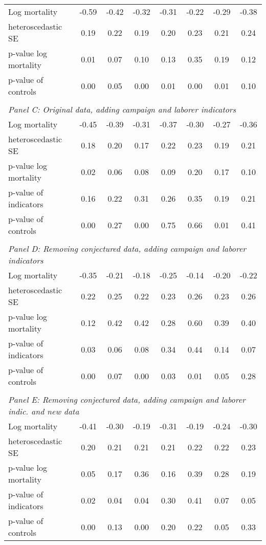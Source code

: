 \begin{table}[htb]
\begin{center}
\begin{tabular}{lccccccc}
Log mortality&-0.59&-0.42&-0.32&-0.31&-0.22&-0.29&-0.38\\
heteroscedastic SE&0.19&0.22&0.19&0.20&0.23&0.21&0.24\\
p-value log mortality&0.01&0.07&0.10&0.13&0.35&0.19&0.12\\
p-value of controls&0.00&0.05&0.00&0.01&0.00&0.01&0.10\\
\vspace{0.1cm}\\ 
\multicolumn{8}{l}{\textit{Panel C: Original data, adding campaign and laborer indicators}}\\ 
Log mortality&-0.45&-0.39&-0.31&-0.37&-0.30&-0.27&-0.36\\
heteroscedastic SE&0.18&0.20&0.17&0.22&0.23&0.19&0.21\\
p-value log mortality&0.02&0.06&0.08&0.09&0.20&0.17&0.10\\
p-value of indicators&0.16&0.22&0.31&0.26&0.35&0.19&0.21\\
p-value of controls&0.00&0.27&0.00&0.75&0.66&0.01&0.41\\
\vspace{0.1cm}\\ 
\multicolumn{8}{l}{\textit{Panel D: Removing conjectured data, adding campaign and laborer indicators}}\\ 
Log mortality&-0.35&-0.21&-0.18&-0.25&-0.14&-0.20&-0.22\\
heteroscedastic SE&0.22&0.25&0.22&0.23&0.26&0.23&0.26\\
p-value log mortality&0.12&0.42&0.42&0.28&0.60&0.39&0.40\\
p-value of indicators&0.03&0.06&0.08&0.34&0.44&0.14&0.07\\
p-value of controls&0.00&0.07&0.00&0.03&0.01&0.05&0.28\\
\vspace{0.1cm}\\ 
\multicolumn{8}{l}{\textit{Panel E: Removing conjectured data, adding campaign and laborer indic. and new data}}\\ 
Log mortality&-0.41&-0.30&-0.19&-0.31&-0.19&-0.24&-0.30\\
heteroscedastic SE&0.20&0.21&0.21&0.21&0.22&0.22&0.23\\
p-value log mortality&0.05&0.17&0.36&0.16&0.39&0.28&0.19\\
p-value of indicators&0.02&0.04&0.04&0.30&0.41&0.07&0.05\\
p-value of controls&0.00&0.13&0.00&0.20&0.22&0.05&0.33\\
\hline \end{tabular}
\end{center}
\end{table}
